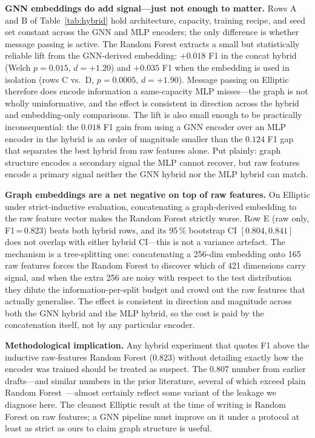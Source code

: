 \textbf{GNN embeddings do add signal---just not enough to matter.}
Rows A and B of Table~\ref{tab:hybrid} hold architecture, capacity,
training recipe, and seed set constant across the GNN and MLP
encoders; the only difference is whether message passing is active.
The Random Forest extracts a small but statistically reliable lift
from the GNN-derived embedding: $+0.018$ F1 in the concat hybrid
(Welch $p = 0.015$, $d = +1.20$) and $+0.035$ F1 when the embedding
is used in isolation (rows C vs.\ D, $p = 0.0005$, $d = +1.90$).
Message passing on Elliptic therefore does encode information a
same-capacity MLP misses---the graph is not wholly uninformative,
and the effect is consistent in direction across the hybrid and
embedding-only comparisons.  The lift is also small enough to be
practically inconsequential: the $0.018$ F1 gain from using a GNN
encoder over an MLP encoder in the hybrid is an order of magnitude
smaller than the $0.124$ F1 gap that separates the best hybrid from
raw features alone.  Put plainly: graph structure encodes a
secondary signal the MLP cannot recover, but raw features encode a
primary signal neither the GNN hybrid nor the MLP hybrid can match.

\textbf{Graph embeddings are a net negative on top of raw features.}
On Elliptic under strict-inductive evaluation, concatenating a
graph-derived embedding to the raw feature vector makes the Random
Forest strictly worse.  Row E (raw only, F1\,=\,$0.823$) beats both
hybrid rows, and its 95\,\% bootstrap CI $[0.804, 0.841]$ does not
overlap with either hybrid CI---this is not a variance artefact.
The mechanism is a tree-splitting one: concatenating a 256-dim
embedding onto 165 raw features forces the Random Forest to discover
which of 421 dimensions carry signal, and when the extra 256 are
noisy with respect to the test distribution they dilute the
information-per-split budget and crowd out the raw features that
actually generalise.  The effect is consistent in direction and
magnitude across both the GNN hybrid and the MLP hybrid, so the cost
is paid by the concatenation itself, not by any particular encoder.

\textbf{Methodological implication.}  Any hybrid experiment that
quotes F1 above the inductive raw-features Random Forest ($0.823$)
without detailing exactly how the encoder was trained should be
treated as suspect.  The 0.807 number from earlier drafts---and
similar numbers in the prior literature, several of which exceed
plain Random Forest~\citep{alarab2020, lo2023}---almost certainly
reflect some variant of the leakage we diagnose here.  The cleanest
Elliptic result at the time of writing is Random Forest on raw
features; a GNN pipeline must improve on it under a protocol at
least as strict as ours to claim graph structure is useful.

